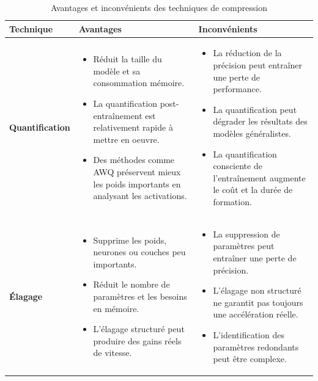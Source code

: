 \documentclass[12pt,a4paper]{report}
\begin{document}
\begin{table}[!htbp]

\centering
\small
\caption{Avantages et inconvénients des techniques de compression}
\label{tab:avantages_inconvenients}
\renewcommand{\arraystretch}{0.3}
\begin{tabularx}{\textwidth}{
    >{\RaggedRight\arraybackslash}p{2.8cm}
    >{\RaggedRight\arraybackslash}X
    >{\RaggedRight\arraybackslash}X
}
\toprule
\textbf{Technique} &
\textbf{Avantages} &
\textbf{Inconvénients} \\
\midrule

\textbf{Quantification} &
\begin{itemize}
    \item Réduit la taille du modèle et sa consommation mémoire.
    \item La quantification post-entraînement est relativement rapide à mettre en oeuvre.
    \item Des méthodes comme AWQ préservent mieux les poids importants en analysant les activations.
\end{itemize}
&
\begin{itemize}
    \item La réduction de la précision peut entraîner une perte de performance.
    \item La quantification peut dégrader les résultats des modèles généralistes.
    \item La quantification consciente de l'entraînement augmente le coût et la durée de formation.
\end{itemize}
\\

\textbf{Élagage} &
\begin{itemize}
    \item Supprime les poids, neurones ou couches peu importants.
    \item Réduit le nombre de paramètres et les besoins en mémoire.
    \item L'élagage structuré peut produire des gains réels de vitesse.
\end{itemize}
&
\begin{itemize}
    \item La suppression de paramètres peut entraîner une perte de précision.
    \item L'élagage non structuré ne garantit pas toujours une accélération réelle.
    \item L'identification des paramètres redondants peut être complexe.
\end{itemize}
\\


\end{tabularx}
\end{table}
\end{document}
